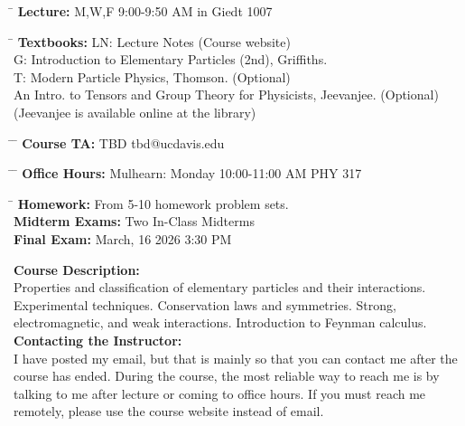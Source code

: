 \documentclass[12pt]{article}
\begin{document}
\noindent
\begin{tabbing}
\hspace*{8em} \= \kill
\textbf {Lecture:} \> M,W,F 9:00-9:50 AM in Giedt 1007 \\
\end{tabbing}
\noindent
\begin{tabbing}
\hspace*{8em} \= \kill
\textbf{Textbooks:}
\> LN: Lecture Notes (Course website)\\
\> G: Introduction to Elementary Particles (2nd), Griffiths.\\
\> T: Modern Particle Physics, Thomson. (Optional)\\
\> An Intro. to Tensors and Group Theory for Physicists, Jeevanjee. (Optional)\\
\> (Jeevanjee is available online at the library)\\
\end{tabbing}
\noindent
\begin{tabbing}
\hspace*{8em}\= \hspace*{10em} \= \kill
\textbf{Course TA:}
\> TBD \> tbd@ucdavis.edu \\
\end{tabbing}
\noindent
\begin{tabbing}
\hspace*{8em}\= \hspace*{10em} \= \kill
\textbf{Office Hours:}
    \> Mulhearn: \> Monday 10:00-11:00 AM PHY 317\\
\end{tabbing}
\noindent
\begin{tabbing}
\hspace*{12em}\= \kill
\textbf{Homework:} \> From 5-10 homework problem sets.\\
\textbf{Midterm Exams:} \> Two In-Class Midterms\\
\textbf{Final Exam:} \>  March, 16 2026 3:30 PM\\
\end{tabbing}
\noindent
\textbf {Course Description:}\\
Properties and classification of elementary particles and their
interactions. Experimental techniques. Conservation laws and
symmetries. Strong, electromagnetic, and weak
interactions. Introduction to Feynman calculus.\\[3pt]

\noindent
\textbf {Contacting the Instructor:}\\
I have posted my email, but that is mainly so that you can contact me
after the course has ended.  During the course, the most reliable way
to reach me is by talking to me after lecture or coming to office
hours.  If you must reach me remotely, please use the course website
instead of email.
\end{document}
